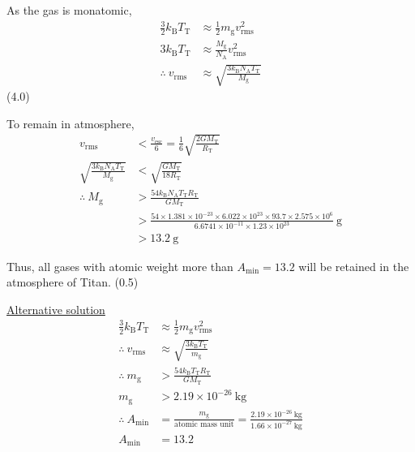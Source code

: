 As the gas is monatomic,
\begin{align*}
\frac{3}{2}k_{\mathrm{B}}T_{\mathrm{T}} &\approx \frac{1}{2}m_{\mathrm{g}}v_{\mathrm{rms}}^2\\
3k_{\mathrm{B}}T_{\mathrm{T}} &\approx \frac{M_{\mathrm{g}}}{N_{\mathrm{A}}}v_{\mathrm{rms}}^2\\
\therefore\ v_{\mathrm{rms}} &\approx \sqrt{\frac{3k_{\mathrm{B}}N_{\mathrm{A}}T_{\mathrm{T}}}{M_{\mathrm{g}}}}
\end{align*}
\hfill(4.0)

To remain in atmosphere,
\begin{align*}
v_{\mathrm{rms}} &< \frac{v_{\mathrm{esc}}}{6} = \frac{1}{6}\sqrt{\frac{2GM_{\mathrm{T}}}{R_{\mathrm{T}}}}\\
\sqrt{\frac{3k_{\mathrm{B}}N_{\mathrm{A}}T_{\mathrm{T}}}{M_{\mathrm{g}}}} &< \sqrt{\frac{GM_{\mathrm{T}}}{18R_{\mathrm{T}}}}\\
\therefore\ M_{\mathrm{g}} &> \frac{54k_{\mathrm{B}}N_{\mathrm{A}}T_{\mathrm{T}}R_{\mathrm{T}}}{GM_{\mathrm{T}}} \tag*{(4.0)}\\
&> \frac{54 \times 1.381\times10^{-23} \times 6.022\times10^{23} \times 93.7 \times 2.575\times10^{6}}
        {6.6741\times10^{-11} \times 1.23\times10^{23}}~\mathrm{g}\\
&> 13.2~\mathrm{g} \tag*{(1.5)}
\end{align*}

Thus, all gases with atomic weight more than $A_{\min} = 13.2$ will be
retained in the atmosphere of Titan. \hfill(0.5)

\medskip
\underline{Alternative solution}
\begin{align*}
\frac{3}{2}k_{\mathrm{B}}T_{\mathrm{T}} &\approx \frac{1}{2}m_{\mathrm{g}}v_{\mathrm{rms}}^2\\
\therefore\ v_{\mathrm{rms}} &\approx \sqrt{\frac{3k_{\mathrm{B}}T_{\mathrm{T}}}{m_{\mathrm{g}}}} \tag*{(4.0)}\\
\therefore\ m_{\mathrm{g}} &> \frac{54k_{\mathrm{B}}T_{\mathrm{T}}R_{\mathrm{T}}}{GM_{\mathrm{T}}} \tag*{(4.0)}\\
m_{\mathrm{g}} &> 2.19\times10^{-26}~\mathrm{kg} \tag*{(1.0)}\\
\therefore\ A_{\min} &= \frac{m_{\mathrm{g}}}{\text{atomic mass unit}}
  = \frac{2.19\times10^{-26}~\mathrm{kg}}{1.66\times10^{-27}~\mathrm{kg}}\\
A_{\min} &= 13.2 \tag*{(1.0)}
\end{align*}

